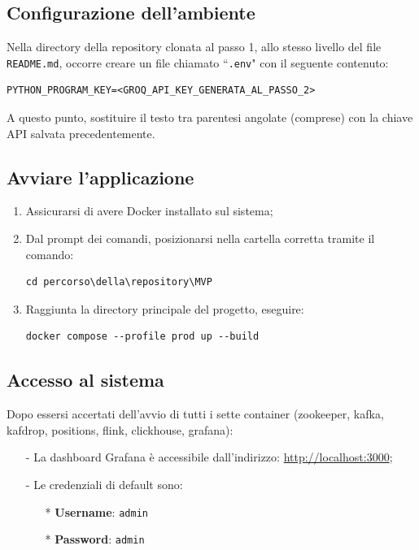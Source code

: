 \documentclass[10pt]{article}
\begin{document}
\begin{justify}
\subsection{Configurazione dell'ambiente}
Nella directory della repository clonata al passo 1, allo stesso livello del file \texttt{README.md}, occorre creare un file chiamato ``\texttt{.env}" con il seguente contenuto:
\begin{verbatim}
PYTHON_PROGRAM_KEY=<GROQ_API_KEY_GENERATA_AL_PASSO_2>
\end{verbatim}
A questo punto, sostituire il testo tra parentesi angolate (comprese) con la chiave API salvata precedentemente.

\subsection{Avviare l'applicazione}
\begin{enumerate}
    \item Assicurarsi di avere Docker installato sul sistema;
    \item Dal prompt dei comandi, posizionarsi nella cartella corretta tramite il comando:
\begin{verbatim}
cd percorso\della\repository\MVP
\end{verbatim}
    \item Raggiunta la directory principale del progetto, eseguire:
\begin{verbatim}
docker compose --profile prod up --build
\end{verbatim}
\end{enumerate}

\subsection{Accesso al sistema}
Dopo essersi accertati dell'avvio di tutti i sette container (zookeeper, kafka, kafdrop, positions, flink, clickhouse, grafana):
\begin{itemize}
    \item[-] La dashboard Grafana è accessibile dall'indirizzo: \url{http://localhost:3000};
    \item[-] Le credenziali di default sono:
    \begin{itemize}
        \item[*] \textbf{Username}: \texttt{admin}
        \item[*] \textbf{Password}: \texttt{admin}
    \end{itemize}
\end{itemize}


\end{justify}
\end{document}

